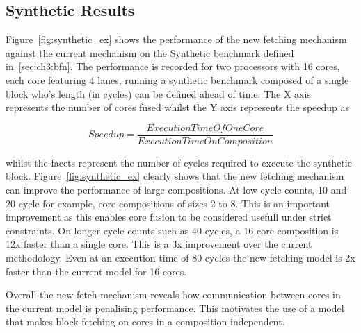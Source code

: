 \subsection{Synthetic Results}

Figure~\ref{fig:synthetic_ex} shows the performance of the new fetching mechanism against the current mechanism on the Synthetic benchmark defined in~\ref{sec:ch3:bfn}.
The performance is recorded for two processors with 16 cores, each core featuring 4 lanes, running a synthetic benchmark composed of a single block who's length (in cycles) can be defined ahead of time.
The X axis represents the number of cores fused whilst the Y axis represents the speedup as 

\begin{equation}
Speedup = \frac{ExecutionTimeOfOneCore}{ExecutionTimeOnComposition}
\end{equation}

whilst the facets represent the number of cycles required to execute the synthetic block.
Figure~\ref{fig:synthetic_ex} clearly shows that the new fetching mechanism can improve the performance of large compositions.
At low cycle counts, 10 and 20 cycle for example, core-compositions of sizes 2 to 8.
This is an important improvement as this enables core fusion to be considered usefull under strict constraints.
On longer cycle counts such as 40 cycles, a 16 core composition is 12x faster than a single core.
This is a 3x improvement over the current methodology.
Even at an execution time of 80 cycles the new fetching model is 2x faster than the current model for 16 cores.

Overall the new fetch mechanism reveals how communication between cores in the current model is penalising performance.
This motivates the use of a model that makes block fetching on cores in a composition independent.